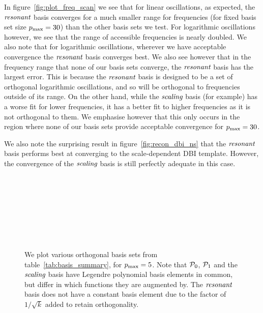     In figure~\ref{fig:plot_freq_scan} we see that for linear oscillations, as expected,
    the $\textit{resonant}$ basis converges for a much smaller range for frequencies
    (for fixed basis set size $p_\text{max}=30$) than the other basis sets we test.
    For logarithmic oscillations however, we see that the range of accessible
    frequencies is nearly doubled. We also note that for logarithmic oscillations,
    wherever we have acceptable convergence the $\textit{resonant}$ basis converges best.
    We also see however that in the frequency range that none of our basis sets
    converge, the $\textit{resonant}$ basis has the largest error. This is because
    the $\textit{resonant}$ basis is designed to be a set of orthogonal logarithmic
    oscillations, and so will be orthogonal to frequencies outside of its range.
    On the other hand, while the $\textit{scaling}$ basis (for example) has
    a worse fit for lower frequencies, it has a better fit to higher frequencies as
    it is not orthogonal to them. We emphasise however that this only occurs
    in the region where none of our basis sets provide acceptable convergence
    for $p_\text{max}=30$.

    We also note the surprising result in figure~\ref{fig:recon_dbi_ns}
    that the $\textit{resonant}$ basis performs best at converging to the
    scale-dependent DBI template. However, the convergence of the
    $\textit{scaling}$ basis is still perfectly adequate in this case.
    \begin{figure}[!pth]
        \centering
        \\
        \\
        \\
        \caption{}
    \end{figure}
    \begin{figure}[!pth]
        \ContinuedFloat
        \centering
        \\
        \\
        \\
        \caption{
            We plot various orthogonal basis sets from table~\ref{tab:basis_summary},
            for $p_\text{max}=5$. Note that $\mathcal{P}_0$, $\mathcal{P}_1$ and the $\textit{scaling}$ basis
            have Legendre polynomial basis elements in common, but differ in
            which functions they are augmented by. The $\textit{resonant}$ basis
            does not have a constant basis element due to the factor of
            $1/\sqrt{k}$ added to retain orthogonality.
            }\label{fig:basis_pmax5_plots}
    \end{figure}
